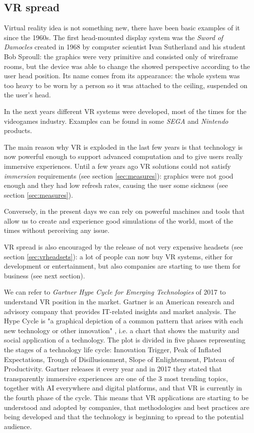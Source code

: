 \documentclass[binding=0.6cm,LaM]{sapthesis}
\begin{document}
\subsection{VR spread}
Virtual reality idea is not something new, there have been basic examples of it since the 1960s. The first head-mounted display system was the \textit{Sword of Damocles} \cite{sutherland1968head} created in 1968 by computer scientist Ivan Sutherland and his student Bob Sproull: the graphics were very primitive and consisted only of wireframe rooms, but the device was able to change the showed perspective according to the user head position. Its name comes from its appearance: the whole system was too heavy to be worn by a person so it was attached to the ceiling, suspended on the user's head.

In the next years different VR systems were developed, most of the times for the videogames industry. Examples can be found in some \textit{SEGA} and \textit{Nintendo} products. 

The main reason why VR is exploded in the last few years is that technology is now powerful enough to support advanced computation and to give users really immersive experiences. Until a few years ago VR solutions could not satisfy \textit{immersion} requirements (see section \ref{sec:measures}): graphics were not good enough and they had low refresh rates, causing the user some sickness (see section \ref{sec:measures}).

Conversely, in the present days we can rely on powerful machines and tools that allow us to create and experience good simulations of the world, most of the times without perceiving any issue.

VR spread is also encouraged by the release of not very expensive headsets (see section \ref{sec:vrheadsets}): a lot of people can now buy VR systems, either for development or entertainment, but also companies are starting to use them for business (see next section).

We can refer to \textit{Gartner Hype Cycle for Emerging Technologies} of 2017 \cite{hypecycle} to understand VR position in the market. Gartner is an American research and advisory company that provides IT-related insights and market analysis. The Hype Cycle is "a graphical depiction of a common pattern that arises with each new technology or other innovation" \cite{hypecycledef}, i.e. a chart that shows the maturity and social application of a technology. The plot is divided in five phases representing the stages of a technology life cycle: Innovation Trigger, Peak of Inflated Expectations, Trough of Disillusionment, Slope of Enlightenment, Plateau of Productivity. 
Gartner releases it every year and in 2017 they stated that transparently immersive experiences are one of the 3 most trending topics, together with AI everywhere and digital platforms, and that VR is currently in the fourth phase of the cycle. This means that VR applications are starting to be understood and adopted by companies, that methodologies and best practices are being developed and that the technology is beginning to spread to the potential audience.
\end{document}
